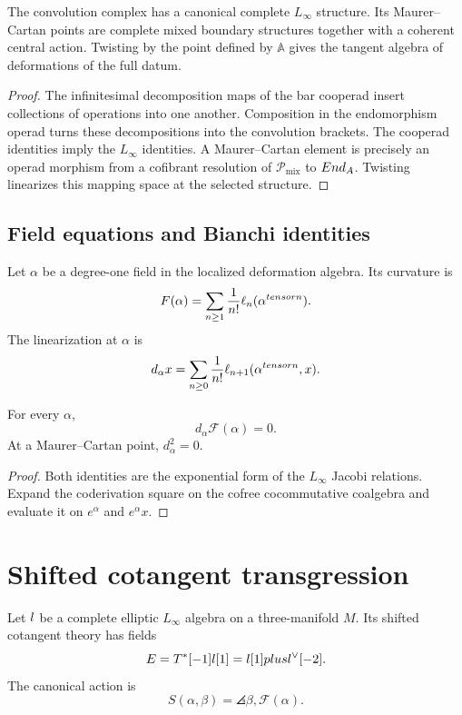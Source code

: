 \begin{theorem}
The convolution complex has a canonical complete $L_\infty$ structure.  Its Maurer--Cartan points are complete mixed boundary structures together with a coherent central action.  Twisting by the point defined by $\mathbb A$ gives the tangent algebra of deformations of the full datum.
\end{theorem}
\begin{proof}
The infinitesimal decomposition maps of the bar cooperad insert collections of operations into one another.  Composition in the endomorphism operad turns these decompositions into the convolution brackets.  The cooperad identities imply the $L_\infty$ identities.  A Maurer--Cartan element is precisely an operad morphism from a cofibrant resolution of $\mathcal P_{\mathrm{mix}}$ to $End_{A}$.  Twisting linearizes this mapping space at the selected structure.
\end{proof}

\section{Field equations and Bianchi identities}
Let $\alpha$ be a degree-one field in the localized deformation algebra.  Its curvature is
\[
 F(\alpha)
 =\sum_{n\ge1}\frac1{n!}\ell_n(\alpha^{tensor n}).
\]
The linearization at $\alpha$ is
\[
 d_\alpha x
 =\sum_{n\ge0}\frac1{n!}
   \ell_{n+1}(\alpha^{tensor n},x).
\]

\begin{theorem}
For every $\alpha$,
\[
 d_\alpha\mathcal F(\alpha)=0.
\]
At a Maurer--Cartan point, $d_\alpha^2=0$.
\end{theorem}
\begin{proof}
Both identities are the exponential form of the $L_\infty$ Jacobi relations.  Expand the coderivation square on the cofree cocommutative coalgebra and evaluate it on $e^\alpha$ and $e^\alpha x$.
\end{proof}

\chapter{Shifted cotangent transgression}
Let $l$ be a complete elliptic $L_\infty$ algebra on a three-manifold $M$.  Its shifted cotangent theory has fields
\[
 E=T^*[-1]l[1]
 =l[1]plusl^\vee[-2].
\]
The canonical action is
\[
 S(\alpha,\beta)
 =\angles{\beta,\mathcal F(\alpha)}.
\]

